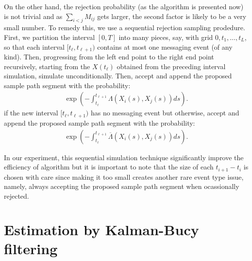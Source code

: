 \documentclass[12pt]{article}%
\begin{document}
On the other hand, the rejection probability (as the algorithm is presented now) is not trivial and as $\sum_{i<j} M_{ij}$ gets larger, the second factor is likely to be a very small number.  To remedy this, we use a sequential rejection sampling prodedure.  First, we partition the interval $[0,T]$ into many pieces, say, with grid $0,t_1,\ldots, t_L$, so that each interval $[t_{\ell},t_{\ell+1})$ contains at most one messaging event (of any kind). Then, progressing from the left end point to the right end point recursively, starting from the $X(t_{\ell})$ obtained from the preceding interval simulation, simulate unconditionally.  Then, accept and append the proposed sample path segment with the probability:
\begin{eqnarray}
\exp\left(-\int_{t_{\ell}}^{t_{\ell+1}} \Lambda(X_i(s),X_j(s)) ds\right).
\end{eqnarray}
if the new interval $[t_{\ell},t_{\ell+1})$ has no messaging event but otherwise, accept and append the proposed sample path segment with the probability:
\begin{eqnarray}
\exp\left(-\int_{t_{\ell}}^{t_{\ell+1}} \overline{\Lambda}(X_i(s),X_j(s)) ds\right).
\end{eqnarray}

In our experiment, this sequential simulation technique significantly improve the efficiency of algorithm but it is important to note that the size of each $t_{i+1} - t_i$ is chosen with care since making it too small creates another rare event type issue, namely, always accepting the proposed sample path segment when ocassionally rejected.   


\section{Estimation by Kalman-Bucy filtering}
\end{document}
